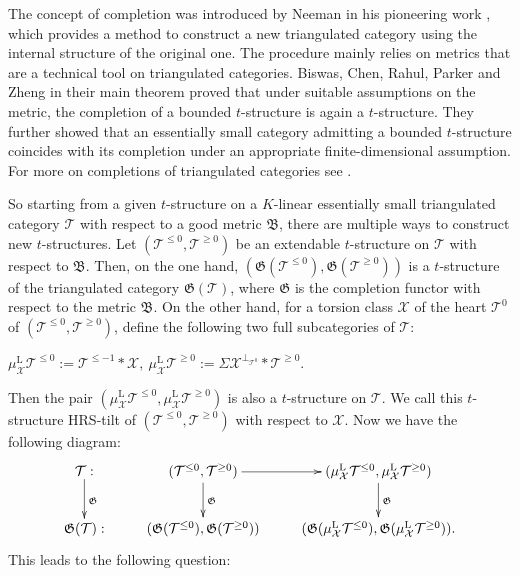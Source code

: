 \documentclass[11pt,a4paper]{amsart}
\numberwithin{equation}{section} \theoremstyle{plain}
\numberwithin{equation}{section} \theoremstyle{definition}
\begin{document}
The concept of completion was introduced by Neeman in his pioneering work \cite{N1}, which provides a method to construct a new triangulated category using the internal structure of the original one. The procedure mainly relies on metrics that are a technical tool on triangulated categories. Biswas, Chen, Rahul, Parker and Zheng in their main theorem \cite[Theorem 3.5]{BCRPZ} proved that under suitable assumptions on the metric, the completion of a bounded $t$-structure is again a $t$-structure. They further showed that an essentially small category admitting a bounded $t$-structure coincides with its completion under an appropriate finite-dimensional assumption. For more on completions of triangulated categories see \cite{CG, HL, M}.

So starting from a given $t$-structure on a $K$-linear essentially small triangulated category $\mathcal{T}$ with respect to a good metric $\mathfrak{B}$, there are multiple ways to construct new $t$-structures. Let $(\mathcal{T}^{\leq0}, \mathcal{T}^{\geq0})$ be an extendable $t$-structure on $\mathcal{T}$ with respect to $\mathfrak{B}$. Then, on the one hand,
$(\mathfrak{G}(\mathcal{T}^{\leq0}), \mathfrak{G}(\mathcal{T}^{\geq0}))$ is a $t$-structure of the triangulated category $\mathfrak{G}(\mathcal{T})$, where $\mathfrak{G}$ is the completion functor with respect to the metric $\mathfrak{B}$. On the other hand, for a torsion class $\mathcal{X}$ of the heart $\mathcal{T}^{0}$ of $(\mathcal{T}^{\leq0}, \mathcal{T}^{\geq0})$,  define the following two full subcategories of $\mathcal{T}$:
\begin{center}
$\mu^{\mathrm{L}}_{\mathcal{X}}\mathcal{T}^{\leq0}:=\mathcal{T}^{\leq-1}*\mathcal{X},~
\mu^{\mathrm{L}}_{\mathcal{X}}\mathcal{T}^{\geq0}:=\Sigma\mathcal{X}^{\perp_{\mathcal{T}^{0}}}*\mathcal{T}^{\geq0}$.
\end{center}
 Then the pair $(\mu^{\mathrm{L}}_{\mathcal{X}}\mathcal{T}^{\leq0},\mu^{\mathrm{L}}_{\mathcal{X}}\mathcal{T}^{\geq0})$ is also a  $t$-structure on $\mathcal{T}$. We call this $t$-structure HRS-tilt of $(\mathcal{T}^{\leq0}, \mathcal{T}^{\geq0})$ with respect to  $\mathcal{X}$. Now we have the following diagram:
 \[ \xymatrix{
 \mathcal{T}:\ar[d]^{\mathfrak{G}} & (\mathcal{T}^{\leq0}, \mathcal{T}^{\geq0}) \ar[r]\ar[d]^{\mathfrak{G}} &(\mu^{\mathrm{L}}_{\mathcal{X}}\mathcal{T}^{\leq0},\mu^{\mathrm{L}}_{\mathcal{X}}\mathcal{T}^{\geq0})   \ar[d]^{\mathfrak{G}}  \\
 \mathfrak{G}(\mathcal{T}):  & (\mathfrak{G}(\mathcal{T}^{\leq0}), \mathfrak{G}(\mathcal{T}^{\geq0})) &  (\mathfrak{G}(\mu^{\mathrm{L}}_{\mathcal{X}}\mathcal{T}^{\leq0}), \mathfrak{G}(\mu^{\mathrm{L}}_{\mathcal{X}}\mathcal{T}^{\geq0}))
 .}\]
This leads to the following question:
\end{document}
